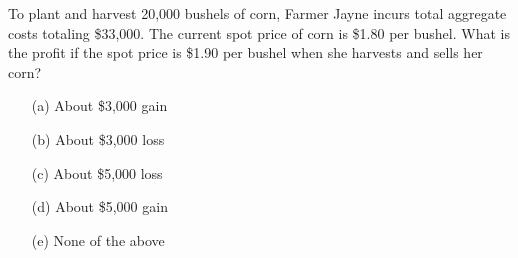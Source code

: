 \documentclass[reqno,letterpaper, onsided,10pt]{amsart}
\newcommand{\sol}[1]{\par\noindent{\bf Solution:} #1}
\renewcommand{\sol}[1]{\newpage}
\begin{document}
\begin{problem}
 To plant and harvest 20,000 bushels of corn, Farmer Jayne incurs total aggregate
  costs totaling \$33,000. The current spot price of corn is \$1.80
  per bushel. What is the profit if the spot price is \$1.90 per
  bushel when she harvests and sells her corn?
\begin{itemize}
\item[(a)] About \$3,000 gain
\vskip0.1cm
\item[(b)] About \$3,000 loss
\vskip0.1cm
\item[(c)] About \$5,000 loss
\vskip0.1cm
\item[(d)] About \$5,000 gain
\vskip0.1cm
\item[(e)] None of the above
\end{itemize}
\end{problem}

\sol{{\bf (d)}\\
\begin{equation}%
    \nonumber
    \begin{split}
      1.90\cdot 20,000 - 33,000 = 5,000
    \end{split}
\end{equation}
}

\medskip
\end{document}

